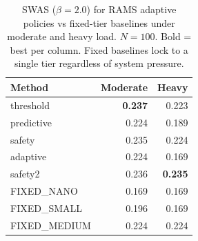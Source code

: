 \begin{table}[t]
\centering
\caption{SWAS ($\beta=2.0$) for RAMS adaptive policies vs fixed-tier baselines under moderate and heavy load. $N=100$. Bold = best per column. Fixed baselines lock to a single tier regardless of system pressure.}
\label{tab:exp7d_baselines}
\begin{tabular}{lrr}
\toprule
Method & Moderate & Heavy \\
\midrule
  threshold & \textbf{0.237} & 0.223 \\
  predictive & 0.224 & 0.189 \\
  safety & 0.235 & 0.224 \\
  adaptive & 0.224 & 0.169 \\
  safety2 & 0.236 & \textbf{0.235} \\
\midrule
  FIXED_NANO & 0.169 & 0.169 \\
  FIXED_SMALL & 0.196 & 0.169 \\
  FIXED_MEDIUM & 0.224 & 0.224 \\
\bottomrule
\end{tabular}
\end{table}
